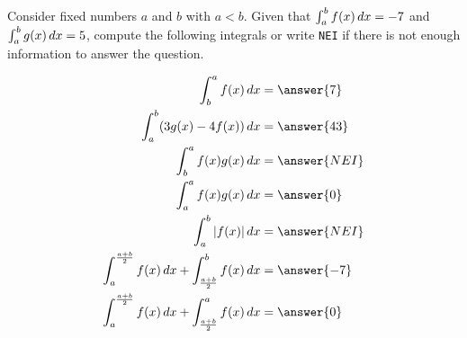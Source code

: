 \documentclass{ximera}
\author{Nela Lakos \and Kyle Parsons}
\begin{document}
\begin{exercise}

Consider fixed numbers $a$ and $b$ with $a<b$. Given that $\int_a^b f(x) \mathop{}\!d x = -7$ and $\int_a^b g(x) \mathop{}\!d x = 5$, compute the following integrals or write \verb|NEI| if there is not enough information to answer the question.

\begin{align*}
\int_b^a f(x) \d x &= \answer{7}\\
\int_a^b (3g(x) - 4f(x)) \d x &= \answer{43}\\
\int_b^a f(x)g(x) \d x &= \answer{NEI}\\
\int_a^a f(x)g(x) \d x &= \answer{0}\\
\int_a^b \left|f(x)\right| \d x &= \answer{NEI}\\
\int_a^{\frac{a+b}{2}} f(x) \d x + \int_{\frac{a+b}{2}}^b f(x) \d x &= \answer{-7}\\
\int_a^{\frac{a+b}{2}} f(x) \d x + \int_{\frac{a+b}{2}}^a f(x) \d x &= \answer{0}\\
\end{align*}

\end{exercise}
\end{document}
